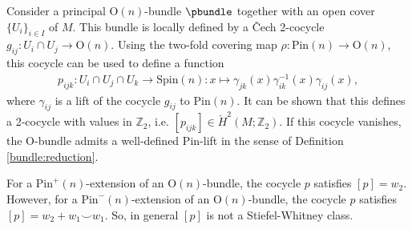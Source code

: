 
    Consider a principal $\mathrm{O}(n)$-bundle $\pbundle$ together with an open cover $\{U_i\}_{i\in I}$ of $M$. This bundle is locally defined by a \v{C}ech 2-cocycle $g_{ij}:U_i\cap U_j\rightarrow\mathrm{O}(n)$. Using the two-fold covering map $\rho:\mathrm{Pin}(n)\rightarrow\mathrm{O}(n)$, this cocycle can be used to define a function
    \begin{gather}
        p_{ijk}:U_i\cap U_j\cap U_k\rightarrow\mathrm{Spin}(n):x\mapsto\gamma_{jk}(x)\gamma^{-1}_{ik}(x)\gamma_{ij}(x),
    \end{gather}
    where $\gamma_{ij}$ is a lift of the cocycle $g_{ij}$ to $\mathrm{Pin}(n)$. It can be shown that this defines a 2-cocycle with values in $\mathbb{Z}_2$, i.e. $[p_{ijk}]\in\check{H}^2(M;\mathbb{Z}_2)$. If this cocycle vanishes, the $\mathrm{O}$-bundle admits a well-defined $\mathrm{Pin}$-lift in the sense of Definition \ref{bundle:reduction}.

    \begin{property}
        For a $\mathrm{Pin}^+(n)$-extension of an $\mathrm{O}(n)$-bundle, the cocycle $p$ satisfies $[p]=w_2$. However, for a $\mathrm{Pin}^-(n)$-extension of an $\mathrm{O}(n)$-bundle, the cocycle $p$ satisfies $[p]=w_2+w_1\smile w_1$. So, in general $[p]$ is not a Stiefel-Whitney class.
    \end{property}

